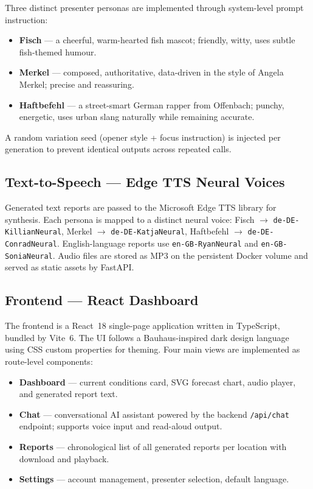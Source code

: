 \documentclass[11pt, a4paper]{article}
\begin{document}
Three distinct presenter personas are implemented through system-level prompt instruction:

\begin{itemize}[noitemsep]
  \item \textbf{Fisch} — a cheerful, warm-hearted fish mascot; friendly, witty, uses
        subtle fish-themed humour.
  \item \textbf{Merkel} — composed, authoritative, data-driven in the style of
        Angela Merkel; precise and reassuring.
  \item \textbf{Haftbefehl} — a street-smart German rapper from Offenbach; punchy,
        energetic, uses urban slang naturally while remaining accurate.
\end{itemize}

A random variation seed (opener style + focus instruction) is injected per generation
to prevent identical outputs across repeated calls.

\subsection{Text-to-Speech — Edge TTS Neural Voices}

Generated text reports are passed to the Microsoft Edge TTS library for synthesis.
Each persona is mapped to a distinct neural voice:
Fisch $\to$ \texttt{de-DE-KillianNeural},
Merkel $\to$ \texttt{de-DE-KatjaNeural},
Haftbefehl $\to$ \texttt{de-DE-ConradNeural}.
English-language reports use \texttt{en-GB-RyanNeural} and \texttt{en-GB-SoniaNeural}.
Audio files are stored as MP3 on the persistent Docker volume and served as static assets
by FastAPI.

\subsection{Frontend — React Dashboard}

The frontend is a React~18 single-page application written in TypeScript, bundled by Vite~6.
The UI follows a Bauhaus-inspired dark design language using CSS custom properties for
theming. Four main views are implemented as route-level components:

\begin{itemize}[noitemsep]
  \item \textbf{Dashboard} — current conditions card, SVG forecast chart, audio player,
        and generated report text.
  \item \textbf{Chat} — conversational AI assistant powered by the backend
        \texttt{/api/chat} endpoint; supports voice input and read-aloud output.
  \item \textbf{Reports} — chronological list of all generated reports per location with
        download and playback.
  \item \textbf{Settings} — account management, presenter selection, default language.
\end{itemize}
\end{document}
